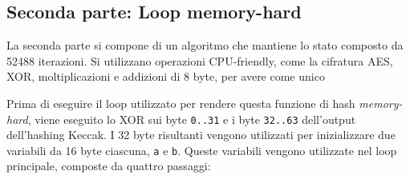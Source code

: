 \subsection{Seconda parte: Loop
memory-hard}\label{seconda-parte-loop-memory-hard}

La seconda parte si compone di un algoritmo che mantiene lo stato
composto da 52488 iterazioni. Si utilizzano operazioni
CPU-friendly, come la cifratura AES, XOR, moltiplicazioni e addizioni di
8 byte, per avere come unico

Prima di eseguire il loop utilizzato per rendere questa funzione di hash
\emph{memory-hard}, viene eseguito lo XOR sui byte \texttt{0..31} e i
byte \texttt{32..63} dell'output dell'hashing Keccak. I 32 byte
risultanti vengono utilizzati per inizializzare due variabili da 16 byte
ciascuna, \texttt{a} e \texttt{b}. Queste variabili vengono utilizzate
nel loop principale, composte da quattro passaggi:

